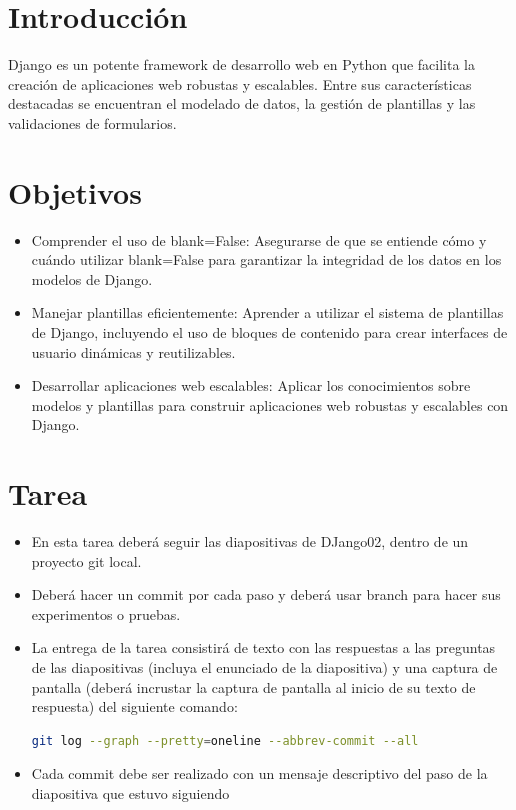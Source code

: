\documentclass{article}
\begin{document}
  \section{Introducción}
    Django es un potente framework de desarrollo web en Python que facilita la creación de aplicaciones web robustas y escalables. 
    Entre sus características destacadas se encuentran el modelado de datos, la gestión de plantillas y las validaciones de formularios.
  

  \section{Objetivos}
  \begin{itemize}
    \item Comprender el uso de blank=False: Asegurarse de que se entiende cómo y cuándo utilizar blank=False para garantizar la integridad de los datos en los modelos de Django.
    \item Manejar plantillas eficientemente: Aprender a utilizar el sistema de plantillas de Django, incluyendo el uso de bloques de contenido para crear interfaces de usuario dinámicas y reutilizables.
    \item Desarrollar aplicaciones web escalables: Aplicar los conocimientos sobre modelos y plantillas para construir aplicaciones web robustas y escalables con Django.
  \end{itemize}

 
	\section{Tarea}
  \begin{itemize}
    \item En esta tarea deberá seguir las diapositivas de DJango02, dentro de un proyecto git local.
    \item Deberá hacer un commit por cada paso y deberá usar branch para hacer sus experimentos o pruebas.
    \item La entrega de la tarea consistirá de texto con las respuestas a las preguntas de las diapositivas (incluya el enunciado de la diapositiva) y una captura de pantalla (deberá incrustar la captura de pantalla al inicio de su texto de respuesta) del siguiente comando:
    \begin{lstlisting}[language=bash]
      git log --graph --pretty=oneline --abbrev-commit --all
    \end{lstlisting}
    \item Cada commit debe ser realizado con un mensaje descriptivo del paso de la diapositiva que estuvo siguiendo
  \end{itemize}
  
\end{document}
